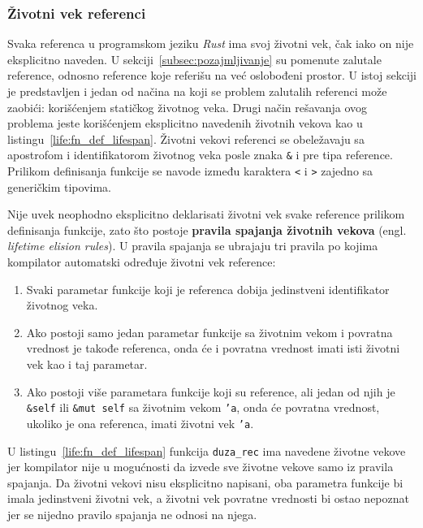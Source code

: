 \documentclass[12pt,oneside]{memoir}
\begin{document}
\subsubsection{Životni vek referenci}
Svaka referenca u programskom jeziku \emph{Rust} ima svoj životni vek, čak iako on nije
eksplicitno naveden. U sekciji~\ref{subsec:pozajmljivanje} su pomenute zalutale reference,
odnosno reference koje referišu na već oslobođeni prostor. U istoj sekciji je predstavljen
i jedan od načina na koji se problem zalutalih referenci može zaobići:
korišćenjem statičkog životnog veka. Drugi način rešavanja ovog problema jeste korišćenjem
eksplicitno navedenih životnih vekova kao u listingu~\ref{life:fn_def_lifespan}.
Životni vekovi referenci se obeležavaju sa apostrofom i identifikatorom životnog veka posle
znaka \texttt{\&} i pre tipa reference. Prilikom definisanja funkcije se navode između
karaktera \texttt{<} i \texttt{>} zajedno sa generičkim tipovima.



Nije uvek neophodno eksplicitno deklarisati životni vek svake reference prilikom
definisanja funkcije, zato što
postoje \textbf{pravila spajanja životnih vekova} (engl. \emph{lifetime elision rules}).
U pravila spajanja se ubrajaju tri
pravila po kojima kompilator automatski određuje životni vek reference:

\begin{enumerate}
  \item Svaki parametar funkcije koji je referenca dobija jedinstveni identifikator
        životnog veka.
  \item Ako postoji samo jedan parametar funkcije sa životnim vekom i povratna vrednost je
        takođe referenca, onda
        će i povratna vrednost imati isti životni vek kao i taj parametar.
  \item Ako postoji više parametara funkcije koji su reference, ali jedan od
        njih je \texttt{\&self} ili \texttt{\&mut self} sa životnim vekom \texttt{'a},
        onda će povratna vrednost, ukoliko je ona referenca, imati životni vek
        \texttt{'a}.
\end{enumerate}

U listingu~\ref{life:fn_def_lifespan} funkcija \texttt{duza\_rec} ima navedene životne
vekove jer kompilator nije u mogućnosti da izvede sve životne vekove samo iz
pravila spajanja. Da životni vekovi nisu eksplicitno napisani, oba parametra funkcije
bi imala jedinstveni životni vek, a životni vek povratne vrednosti bi ostao nepoznat
jer se nijedno pravilo spajanja ne odnosi na njega.
\end{document}
